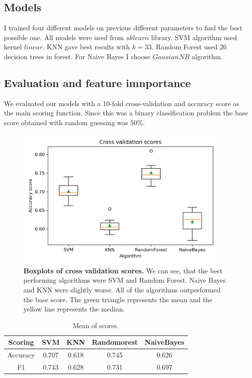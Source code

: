 \documentclass[fleqn,moreauthors,10pt]{ds_report}
\begin{document}
\subsection{Models}
I trained four different models on previous different parameters to find the best possible one. All models were used from $sklearn$ library. SVM algorithm used kernel $linear$. KNN gave best results with $k=33$. Random Forest used $26$ decision trees in forest. For Naive Bayes I choose $GausianNB$ algorithm.

\subsection{Evaluation and feature imnportance}
We evaluated our models with a 10-fold cross-validation and accuracy score as the main scoring function. Since this was a binary classification problem the base score obtained with random guessing was $50\%$.


\begin{figure}[h]\centering
	\includegraphics[width=\linewidth, height=7cm]{problem_1_boxplot.png}
	
	\caption{\textbf{Boxplots of cross validation scores.} We can see, that the best performing algorithms were SVM and Random Forest. Naive Bayes and KNN were slightly worse. All of the algorithms outperformed the base score.  The green triangle represents the mean and the yellow line represents the median. }
	\label{boxplot1}
\end{figure}


\begin{center}
\begin{table}
\caption{\label{table_1} Mean of scores.}

\begin{tabular}{|c|| c| c| c| c|} 
 \hline
 Scoring  & SVM & KNN & Randomorest  & NaiveBayes\\ 
 \hline\hline
 Accuracy & 0.707 & 0.618 &  0.745 & 0.626\\ 
 \hline
 F1 & 0.743 & 0.628 & 0.731 & 0.697 \\
 \hline
\end{tabular}
\end{table}
\end{center}
\end{document}
